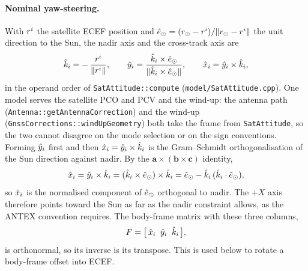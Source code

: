 \documentclass[main.tex]{subfiles}
\begin{document}
\paragraph{Nominal yaw-steering.}
With $r^{i}$ the satellite ECEF position and
$\hat{e}_\odot=(r_\odot-r^{i})/\lVert r_\odot-r^{i}\rVert$ the unit
direction to the Sun, the nadir axis and the cross-track axis are
\begin{equation}
\hat{k}_i = -\,\frac{r^{i}}{\lVert r^{i}\rVert},
\qquad
\hat{y}_i = \frac{\hat{k}_i\times\hat{e}_\odot}{\lVert\hat{k}_i\times\hat{e}_\odot\rVert},
\qquad
\hat{x}_i = \hat{y}_i\times\hat{k}_i,
\label{eq:obsphys-yaw-frame}
\end{equation}
in the operand order of \texttt{SatAttitude::compute}
(\texttt{model/SatAttitude.cpp}).  One model serves the satellite PCO and
PCV and the wind-up: the antenna path
(\texttt{Antenna::getAntennaCorrection}) and the wind-up
(\texttt{GnssCorrections::windUpGeometry}) both take the frame from
\texttt{SatAttitude}, so the two cannot disagree on the mode selection or
on the sign conventions.  Forming $\hat{y}_i$ first and then
$\hat{x}_i=\hat{y}_i\times\hat{k}_i$ is the Gram--Schmidt orthogonalisation of the
Sun direction against nadir.  By the
$\bm{a}\times(\bm{b}\times\bm{c})$ identity,
\begin{equation}
\hat{x}_i = \hat{y}_i\times\hat{k}_i
      = (\hat{k}_i\times\hat{e}_\odot)\times\hat{k}_i
      = \hat{e}_\odot - \hat{k}_i\,(\hat{k}_i\cdot\hat{e}_\odot),
\label{eq:obsphys-xsun-gramschmidt}
\end{equation}
so $\hat{x}_i$ is the normalised component of $\hat{e}_\odot$ orthogonal to nadir.
The $+X$ axis therefore points toward the Sun as far as the nadir
constraint allows, as the ANTEX convention requires.  The body-frame
matrix with these three columns,
\begin{equation}
F = \big[\,\hat{x}_i\;\;\hat{y}_i\;\;\hat{k}_i\,\big],
\label{eq:obsphys-bodyframe-matrix}
\end{equation}
is orthonormal, so its inverse is its transpose.  This is used below to
rotate a body-frame offset into ECEF.
\end{document}
